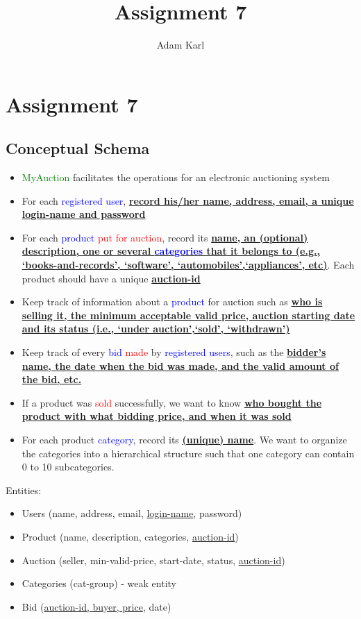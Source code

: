 \documentclass[a4paper]{article}
\title{Assignment 7}
\author{Adam Karl}
\begin{document}
\maketitle

\section{Assignment 7}
\subsection{Conceptual Schema}
\begin{itemize}
    \item \textcolor{green}{MyAuction} facilitates  the  operations  for  an  electronic  auctioning  system
    \item For each \textcolor{blue}{registered user}, \textbf{\underline{ record his/her name, address, email, a unique login-name and password}} 
    \item For  each  \textcolor{blue}{product}  \textcolor{red}{put  for  auction},  record  its  \textbf{\underline{name,  an  (optional)  description,  one  or several  \textcolor{blue}{categories} that it belongs to (e.g., ‘books-and-records’, ‘software’, ‘automobiles’,‘appliances’, etc)}}.  Each product should have a unique \textbf{\underline{auction-id}}
    \item Keep track of information about a \textcolor{blue}{product} for auction such as \textbf{\underline{who is selling it, the minimum acceptable valid price, auction starting date and its status (i.e., ‘under auction’,‘sold’, ‘withdrawn’)}}
    \item Keep track of every \textcolor{blue}{bid} \textcolor{red}{made} by \textcolor{blue}{registered users}, such as the \textbf{\underline{bidder’s name, the date when the bid was made, and the valid amount of the bid, etc.}}
    \item If a product was \textcolor{red}{sold} successfully, we want to know \textbf{\underline{who bought the product with what bidding price, and when it was sold}}
    \item For each product \textcolor{blue}{category}, record its \textbf{\underline{(unique) name}}.  We want to organize the categories into a hierarchical structure such that one category can contain 0 to 10 subcategories.
\end{itemize}

\noindent
Entities:
\begin{itemize}
    \item Users (name, address, email, \underline{login-name}, password)
    \item Product (name, description, categories, \underline{auction-id})
    \item Auction (seller, min-valid-price, start-date, status, \underline{auction-id})
    \item Categories (cat-group) - weak entity
    \item Bid (\underline{auction-id, buyer, price}, date)
\end{itemize}
\end{document}
